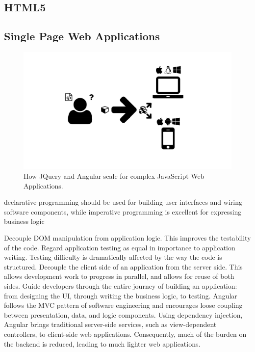 \subsection{HTML5}
\label{sec:html5}

\subsection{Single Page Web Applications}

\begin{figure}
  \centering
  \includegraphics[width=\textwidth,page=3]{images/Figures.pdf}
  \caption{How JQuery and Angular scale for complex JavaScript Web Applications.}
  \label{Figure:jquery-vs-angular}
\end{figure}

declarative programming should be used for building user interfaces and wiring software components, while imperative programming is excellent for expressing business logic


Decouple DOM manipulation from application logic. This improves the testability of the code. Regard application testing as equal in importance to application writing. Testing difficulty is dramatically affected by the way the code is structured.
Decouple the client side of an application from the server side. This allows development work to progress in parallel, and allows for reuse of both sides.
Guide developers through the entire journey of building an application: from designing the UI, through writing the business logic, to testing.
Angular follows the MVC pattern of software engineering and encourages loose coupling between presentation, data, and logic components. Using dependency injection, Angular brings traditional server-side services, such as view-dependent controllers, to client-side web applications. Consequently, much of the burden on the backend is reduced, leading to much lighter web applications.

